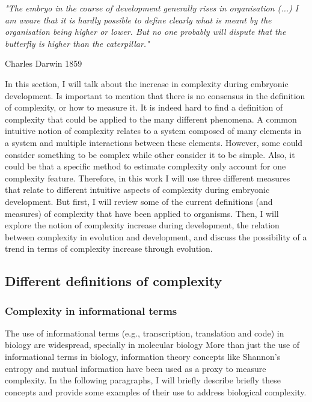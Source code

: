 \setlength{\epigraphrule}{0\p@}
\setlength{\epigraphwidth}{.7\textwidth}
\epigraph{\textit{"The embryo in the course of development generally rises in organisation (...) I am aware that it is hardly possible to define clearly what is meant by the organisation being higher or lower. But no one probably will dispute that the butterfly is higher than the caterpillar."}}{Charles Darwin 1859}

In this section, I will talk about the increase in complexity during embryonic development. Is important to mention that there is no consensus in the definition of complexity, or how to measure it.
%
It is indeed hard to find a definition of complexity that could be applied to the many different phenomena. A common intuitive notion of complexity relates to a system composed of many elements in a system and multiple interactions between these elements. However, some could consider something to be complex while other consider it to be simple.
%
Also, it could be that a specific method to estimate complexity only account for one complexity feature.
Therefore, in this work I will use three different measures that relate to different intuitive aspects of complexity during embryonic development.
But first, I will review some of the current definitions (and measures) of complexity that have been applied to organisms.
Then, I will explore the notion of complexity increase during development, the relation between complexity in evolution and development, and discuss the possibility of a trend in terms of complexity increase through evolution.

\subsection{Different definitions of complexity}


\subsubsection{Complexity in informational terms}

The use of informational terms (e.g., transcription, translation and code) in biology are widespread, specially in molecular biology \citep{Smith2000,yockey2005information}
More than just the use of informational terms in biology, information theory concepts like Shannon's entropy and mutual information have been used as a proxy to measure complexity.
In the following paragraphs, I will briefly describe briefly these concepts and provide some examples of their use to address biological complexity.


